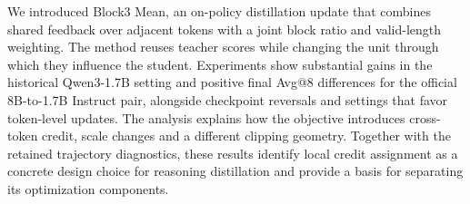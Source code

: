 We introduced Block3 Mean, an on-policy distillation update that combines shared feedback over adjacent tokens with a joint block ratio and valid-length weighting. The method reuses teacher scores while changing the unit through which they influence the student. Experiments show substantial gains in the historical Qwen3-1.7B setting and positive final Avg@8 differences for the official 8B-to-1.7B Instruct pair, alongside checkpoint reversals and settings that favor token-level updates. The analysis explains how the objective introduces cross-token credit, scale changes and a different clipping geometry. Together with the retained trajectory diagnostics, these results identify local credit assignment as a concrete design choice for reasoning distillation and provide a basis for separating its optimization components.
